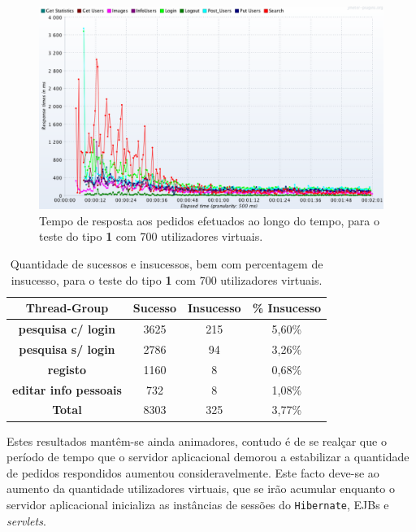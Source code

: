 \begin{figure}[H]
    \centering
    \includegraphics[width=1\textwidth]{images/Testes/3PC_700R.png}
    \caption{Tempo de resposta aos pedidos efetuados ao longo do tempo, para o teste do tipo \textbf{1} com 700 utilizadores virtuais.}
    \label{fig:3PC_700_response}
\end{figure}

\begin{table}[H]
\centering
\caption{Quantidade de sucessos e insucessos, bem com percentagem de insucesso, para o teste do tipo \textbf{1} com 700 utilizadores virtuais.}
\begin{tabular}{cccc}
\hline
\rowcolor[HTML]{EFEFEF} 
\textbf{Thread-Group}                  & \textbf{Sucesso} & \textbf{Insucesso} & \textbf{\% Insucesso} \\ \hline
\textbf{pesquisa c/ login}             & 3625             & 215                & 5,60\%                \\
\textbf{pesquisa s/ login}             & 2786             & 94                 & 3,26\%                \\
\textbf{registo}                       & 1160             & 8                  & 0,68\%                \\
\textbf{editar info pessoais}          & 732              & 8                  & 1,08\%                \\ \hline
\cellcolor[HTML]{EFEFEF}\textbf{Total} & 8303             & 325                & 3,77\%                \\ \hline
\end{tabular}
\end{table}

Estes resultados mantêm-se ainda animadores, contudo é de se realçar que o período de tempo que o servidor aplicacional demorou a estabilizar a quantidade de pedidos respondidos aumentou consideravelmente. Este facto deve-se ao aumento da quantidade utilizadores virtuais, que se irão acumular enquanto o servidor aplicacional inicializa as instâncias de sessões do \texttt{Hibernate}, EJBs e \textit{servlets}. 

